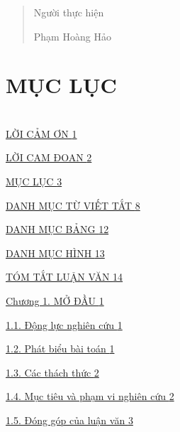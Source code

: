 \begin{quote}
Người thực hiện

Phạm Hoàng Hảo
\end{quote}

\section{MỤC LỤC}\label{mux1ee5c-lux1ee5c}

\section{}\label{section}

\hyperref[lux1eddi-cux1ea3m-ux1a1n]{LỜI CẢM ƠN \hyperref[lux1eddi-cux1ea3m-ux1a1n]{1}}

\hyperref[lux1eddi-cam-ux111oan]{LỜI CAM ĐOAN \hyperref[lux1eddi-cam-ux111oan]{2}}

\hyperref[mux1ee5c-lux1ee5c]{MỤC LỤC \hyperref[mux1ee5c-lux1ee5c]{3}}

\hyperref[danh-mux1ee5c-tux1eeb-viux1ebft-tux1eaft]{DANH MỤC TỪ VIẾT TẮT \hyperref[danh-mux1ee5c-tux1eeb-viux1ebft-tux1eaft]{8}}

\hyperref[danh-mux1ee5c-bux1ea3ng]{DANH MỤC BẢNG \hyperref[danh-mux1ee5c-bux1ea3ng]{12}}

\hyperref[danh-mux1ee5c-huxecnh]{DANH MỤC HÌNH \hyperref[danh-mux1ee5c-huxecnh]{13}}

\hyperref[tuxf3m-tux1eaft-luux1eadn-vux103n]{TÓM TẮT LUẬN VĂN \hyperref[tuxf3m-tux1eaft-luux1eadn-vux103n]{14}}

\hyperref[chux1b0ux1a1ng-1.-mux1edf-ux111ux1ea7u]{Chương 1. MỞ ĐẦU \hyperref[chux1b0ux1a1ng-1.-mux1edf-ux111ux1ea7u]{1}}

\hyperref[ux111ux1ed9ng-lux1ef1c-nghiuxean-cux1ee9u]{1.1. Động lực nghiên cứu \hyperref[ux111ux1ed9ng-lux1ef1c-nghiuxean-cux1ee9u]{1}}

\hyperref[phuxe1t-biux1ec3u-buxe0i-touxe1n]{1.2. Phát biểu bài toán \hyperref[phuxe1t-biux1ec3u-buxe0i-touxe1n]{1}}

\hyperref[cuxe1c-thuxe1ch-thux1ee9c]{1.3. Các thách thức \hyperref[cuxe1c-thuxe1ch-thux1ee9c]{2}}

\hyperref[mux1ee5c-tiuxeau-vuxe0-phux1ea1m-vi-nghiuxean-cux1ee9u]{1.4. Mục tiêu và phạm vi nghiên cứu \hyperref[mux1ee5c-tiuxeau-vuxe0-phux1ea1m-vi-nghiuxean-cux1ee9u]{2}}

\hyperref[ux111uxf3ng-guxf3p-cux1ee7a-luux1eadn-vux103n]{1.5. Đóng góp của luận văn \hyperref[ux111uxf3ng-guxf3p-cux1ee7a-luux1eadn-vux103n]{3}}

